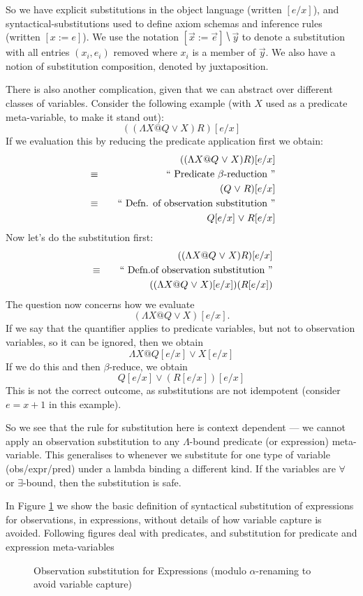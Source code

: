 So we have explicit substitutions in the object language (written $[e/x]$),
and syntactical-substitutions used to define axiom schemas and inference rules
(written $[x:=e]$).
We use the notation $[\vec x := \vec e]\hide\vec y$
to denote a substitution with all entries $(x_i,e_i)$ removed
where $x_i$ is a member of $\vec y$.
We also have a notion of substitution composition,
denoted by juxtaposition.

There is also another complication,
given that we can abstract over different classes of variables.
Consider the following example (with $X$ used as a predicate meta-variable,
to make it stand out):
$$
  ((\Lambda X @ Q \lor X)R)[e/x]
$$
If we evaluation this by reducing the predicate application first we obtain:
\begin{eqnarray*}
  && ((\Lambda X @ Q \mathrel{\vee} X)R)[e/x]
\\&\equiv&\quad\textrm{`` Predicate $\beta$-reduction ''}
\\&& (Q \mathrel{\vee} R)[e/x]
\\&\equiv&\quad\textrm{`` Defn. of observation substitution ''}
\\&& Q[e/x] \mathrel{\vee} R[e/x]
\end{eqnarray*}
Now let's do the substitution first:
\begin{eqnarray*}
  && ((\Lambda X @ Q \mathrel{\vee} X)R)[e/x]
\\&\equiv&\quad\textrm{`` Defn.of observation substitution ''}
\\&& ((\Lambda X @ Q \mathrel{\vee} X)[e/x])(R[e/x])
\end{eqnarray*}
The question now concerns how we evaluate
$$
(\Lambda X @ Q \lor X)[e/x].
$$
If we say that the quantifier applies to predicate variables,
but not to observation variables, so it can be ignored,
then we obtain
$$
  \Lambda X @ Q[e/x] \lor X[e/x]
$$
If we do this and then $\beta$-reduce, we obtain
$$
  Q[e/x] \lor (R[e/x])[e/x]
$$
This is not the correct outcome, as substitutions are not idempotent
(consider $e=x+1$ in this example).

So we see that the rule for substitution here is
context dependent --- we cannot apply an observation substitution
to any $\Lambda$-bound predicate (or expression) meta-variable.
This generalises to whenever we substitute for one type
of variable (obs/expr/pred) under a lambda binding a different kind.
If the variables are $\forall$ or $\exists$-bound,
then the substitution is safe.

In Figure \ref{fig:UTP2:obs-expr-Expr-subst}
we show the basic definition of syntactical substitution of expressions
for observations, in expressions,
without details of how variable capture is avoided.
Following figures deal with predicates, and substitution
for predicate and expression meta-variables
\begin{figure}
  \boxedm{
    \DEFOEESUBST
  }
  \caption{%
    Observation substitution for Expressions
     (modulo $\alpha$-renaming to avoid variable capture)
  }
  \label{fig:UTP2:obs-expr-Expr-subst}
\end{figure}

